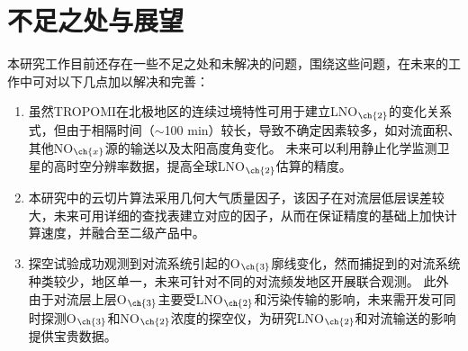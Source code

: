 \section{不足之处与展望}

本研究工作目前还存在一些不足之处和未解决的问题，围绕这些问题，在未来的工作中可对以下几点加以解决和完善：

\begin{enumerate}[label=（\arabic*）, labelindent=\parindent, nosep, leftmargin=0pt, widest=0, itemindent=*, topsep=0pt, partopsep=0pt, parsep=0pt]

\item 虽然TROPOMI在北极地区的连续过境特性可用于建立LNO$_{\ch{2}}$的变化关系式，但由于相隔时间（$\sim$100 min）较长，导致不确定因素较多，如对流面积、其他NO$_{\ch{x}}$源的输送以及太阳高度角变化。
未来可以利用静止化学监测卫星的高时空分辨率数据，提高全球LNO$_{\ch{2}}$估算的精度。


\item 本研究中的云切片算法采用几何大气质量因子，该因子在对流层低层误差较大，未来可用详细的查找表建立对应的因子，从而在保证精度的基础上加快计算速度，并融合至二级产品中。

\item 探空试验成功观测到对流系统引起的O$_{\ch{3}}$廓线变化，然而捕捉到的对流系统种类较少，地区单一，未来可针对不同的对流频发地区开展联合观测。
此外由于对流层上层O$_{\ch{3}}$主要受LNO$_{\ch{2}}$和污染传输的影响，未来需开发可同时探测O$_{\ch{3}}$和NO$_{\ch{2}}$浓度的探空仪，为研究LNO$_{\ch{2}}$和对流输送的影响提供宝贵数据。

\end{enumerate}
